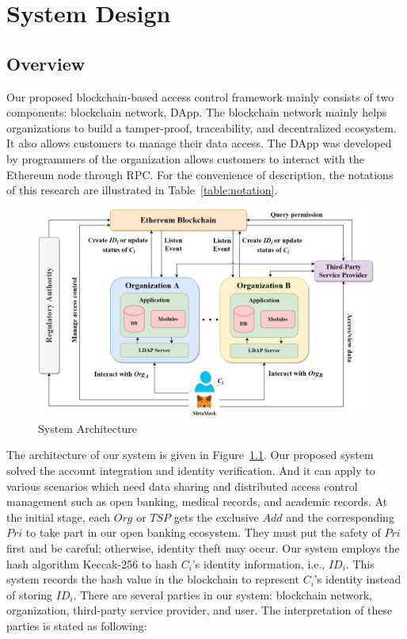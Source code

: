 \chapter{System Design}
\label{chapter:design}

\section{Overview}
    Our proposed blockchain-based access control framework mainly consists of two components: blockchain network, DApp. The blockchain network mainly helps organizations to build a tamper-proof, traceability, and decentralized ecosystem. It also allows customers to manage their data access. The DApp was developed by programmers of the organization allows customers to interact with the Ethereum node through RPC. For the convenience of description, the notations of this research are illustrated in Table~\ref{table:notation}.

    
    \newpage    

    \begin{figure}[htb]
        \centering
        \includegraphics[height=!,width=1\linewidth,keepaspectratio=true]{figures/system_architecture.png}
        \caption{{\footnotesize System Architecture}}
        \label{fig:system_architecture}
    \end{figure}
    The architecture of our system is given in Figure~\ref{fig:system_architecture}. Our proposed system solved the account integration and identity verification. And it can apply to various scenarios which need data sharing and distributed access control management such as open banking, medical records, and academic records. At the initial stage, each \(Org\) or \(TSP\) gets the exclusive \(Add\) and the corresponding \(Pri\) to take part in our open banking ecosystem. They must put the safety of \(Pri\) first and be careful; otherwise, identity theft may occur. Our system employs the hash algorithm Keccak-256 to hash \(C_i\)'s identity information, i.e., \(ID_i\). This system records the hash value in the blockchain to represent \(C_i\)'s identity instead of storing \(ID_i\). There are several parties in our system: blockchain network, organization, third-party service provider, and user. The interpretation of these parties is stated as following:\par

